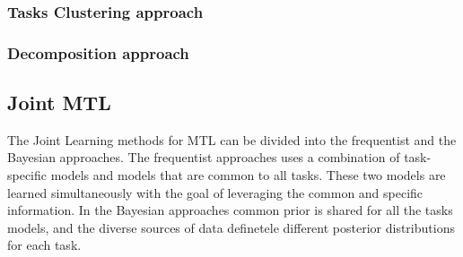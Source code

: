 



\subsubsection*{Tasks Clustering approach}







\subsubsection*{Decomposition approach}




\subsection{Joint MTL}
The Joint Learning methods for MTL can be divided into the frequentist and the Bayesian approaches.
The frequentist approaches uses a combination of task-specific models and models that are common to all tasks. These two models are learned simultaneously with the goal of leveraging the common and specific information.
In the Bayesian approaches common prior is shared for all the tasks models, and the diverse sources of data definetele different posterior distributions for each task.


